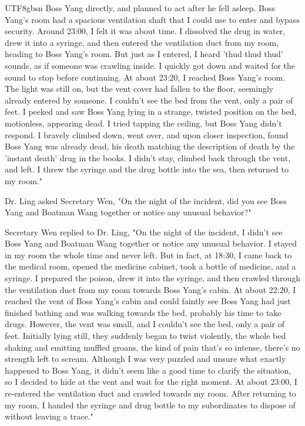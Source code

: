 \documentclass[11pt]{article}
\begin{document}
{\begin{CJK}{UTF8}{gbsn}
Boss Yang directly, and planned to act after he fell asleep. Boss Yang's room had a spacious ventilation shaft that I could use to enter and bypass security. Around 23:00, I felt it was about time. I dissolved the drug in water, drew it into a syringe, and then entered the ventilation duct from my room, heading to Boss Yang’s room. But just as I entered, I heard 'thud thud thud' sounds, as if someone was crawling inside. I quickly got down and waited for the sound to stop before continuing. At about 23:20, I reached Boss Yang's room. The light was still on, but the vent cover had fallen to the floor, seemingly already entered by someone. I couldn’t see the bed from the vent, only a pair of feet. I peeked and saw Boss Yang lying in a strange, twisted position on the bed, motionless, appearing dead. I tried tapping the ceiling, but Boss Yang didn’t respond. I bravely climbed down, went over, and upon closer inspection, found Boss Yang was already dead, his death matching the description of death by the 'instant death' drug in the books. I didn’t stay, climbed back through the vent, and left. I threw the syringe and the drug bottle into the sea, then returned to my room."

Dr. Ling asked Secretary Wen, "On the night of the incident, did you see Boss Yang and Boatman Wang together or notice any unusual behavior?"

Secretary Wen replied to Dr. Ling, "On the night of the incident, I didn’t see Boss Yang and Boatman Wang together or notice any unusual behavior. I stayed in my room the whole time and never left. But in fact, at 18:30, I came back to the medical room, opened the medicine cabinet, took a bottle of medicine, and a syringe. I prepared the poison, drew it into the syringe, and then crawled through the ventilation duct from my room towards Boss Yang’s cabin. At about 22:20, I reached the vent of Boss Yang's cabin and could faintly see Boss Yang had just finished bathing and was walking towards the bed, probably his time to take drugs. However, the vent was small, and I couldn’t see the bed, only a pair of feet. Initially lying still, they suddenly began to twist violently, the whole bed shaking and emitting muffled groans, the kind of pain that's so intense, there's no strength left to scream. Although I was very puzzled and unsure what exactly happened to Boss Yang, it didn’t seem like a good time to clarify the situation, so I decided to hide at the vent and wait for the right moment. At about 23:00, I re-entered the ventilation duct and crawled towards my room. After returning to my room, I handed the syringe and drug bottle to my subordinates to dispose of without leaving a trace."


\end{CJK}}
\end{document}
